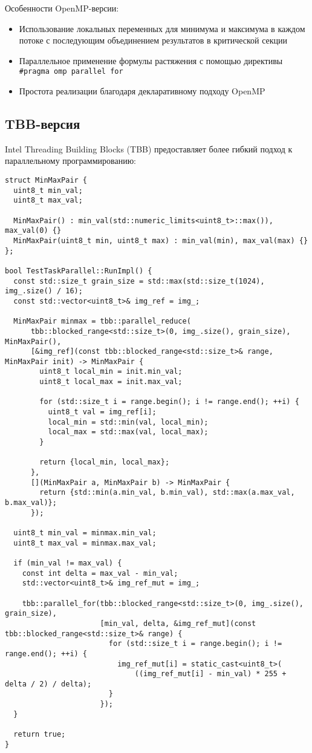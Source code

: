 \documentclass[a4paper,14pt]{article}
\begin{document}
Особенности OpenMP-версии:
\begin{itemize}
    \item Использование локальных переменных для минимума и максимума в каждом потоке
    с последующим объединением результатов в критической секции
    \item Параллельное применение формулы растяжения с помощью директивы \texttt{\#pragma omp parallel for}
    \item Простота реализации благодаря декларативному подходу OpenMP
\end{itemize}

\subsection{TBB-версия}

Intel Threading Building Blocks (TBB) предоставляет более гибкий подход к параллельному программированию:

\begin{lstlisting}[caption=Основные компоненты TBB-версии]
struct MinMaxPair {
  uint8_t min_val;
  uint8_t max_val;

  MinMaxPair() : min_val(std::numeric_limits<uint8_t>::max()), max_val(0) {}
  MinMaxPair(uint8_t min, uint8_t max) : min_val(min), max_val(max) {}
};

bool TestTaskParallel::RunImpl() {
  const std::size_t grain_size = std::max(std::size_t(1024), img_.size() / 16);
  const std::vector<uint8_t>& img_ref = img_;

  MinMaxPair minmax = tbb::parallel_reduce(
      tbb::blocked_range<std::size_t>(0, img_.size(), grain_size), MinMaxPair(),
      [&img_ref](const tbb::blocked_range<std::size_t>& range, MinMaxPair init) -> MinMaxPair {
        uint8_t local_min = init.min_val;
        uint8_t local_max = init.max_val;

        for (std::size_t i = range.begin(); i != range.end(); ++i) {
          uint8_t val = img_ref[i];
          local_min = std::min(val, local_min);
          local_max = std::max(val, local_max);
        }

        return {local_min, local_max};
      },
      [](MinMaxPair a, MinMaxPair b) -> MinMaxPair {
        return {std::min(a.min_val, b.min_val), std::max(a.max_val, b.max_val)};
      });

  uint8_t min_val = minmax.min_val;
  uint8_t max_val = minmax.max_val;

  if (min_val != max_val) {
    const int delta = max_val - min_val;
    std::vector<uint8_t>& img_ref_mut = img_;

    tbb::parallel_for(tbb::blocked_range<std::size_t>(0, img_.size(), grain_size),
                      [min_val, delta, &img_ref_mut](const tbb::blocked_range<std::size_t>& range) {
                        for (std::size_t i = range.begin(); i != range.end(); ++i) {
                          img_ref_mut[i] = static_cast<uint8_t>(
                              ((img_ref_mut[i] - min_val) * 255 + delta / 2) / delta);
                        }
                      });
  }

  return true;
}
\end{lstlisting}
\end{document}
